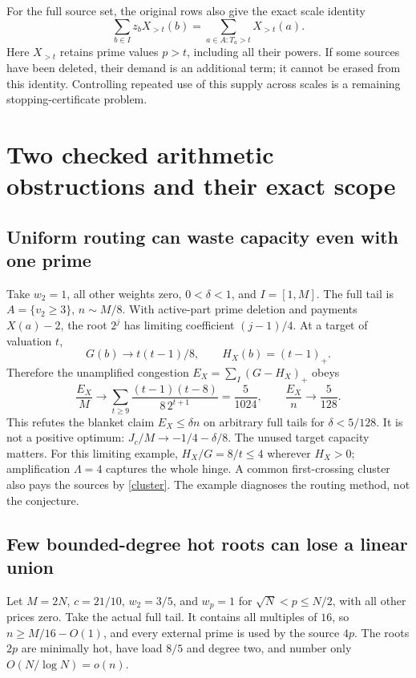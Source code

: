 \documentclass[11pt,a4paper]{article}
\begin{document}
For the full source set, the original rows also give the exact scale identity
\[
 \sum_{b\in I}z_bX_{>t}(b)
 =\sum_{a\in A:T_a>t}X_{>t}(a).
\]
Here $X_{>t}$ retains prime values $p>t$, including all their powers. If some
sources have been deleted, their demand is an additional term; it cannot
be erased from this identity. Controlling repeated use of this supply
across scales is a remaining stopping-certificate problem.

\section{Two checked arithmetic obstructions and their exact scope}

\subsection{Uniform routing can waste capacity even with one prime}

Take $w_2=1$, all other weights zero, $0<\delta<1$, and $I=[1,M]$.
The full tail is $A=\{v_2\ge3\}$, $n\sim M/8$. With active-part prime deletion
and payments $X(a)-2$, the root $2^j$ has limiting coefficient $(j-1)/4$.
At a target of valuation $t$,
\[
 G(b)\longrightarrow t(t-1)/8,\qquad H_X(b)=(t-1)_+.
\]
Therefore the unamplified congestion $E_X=\sum_I(G-H_X)_+$ obeys
\begin{equation}
 \frac{E_X}{M}\longrightarrow
 \sum_{t\ge9}\frac{(t-1)(t-8)}{8\,2^{t+1}}=\frac5{1024},
 \qquad \frac{E_X}{n}\longrightarrow\frac5{128}.           \label{oneprime}
\end{equation}
This refutes the blanket claim $E_X\le\delta n$ on arbitrary full tails
for $\delta<5/128$. It is not a positive optimum:
$J_c/M\to-1/4-\delta/8$. The unused target capacity matters.
For this limiting example, $H_X/G=8/t\le4$ wherever $H_X>0$; amplification
$\Lambda=4$ captures the whole hinge. A common first-crossing cluster also
pays the sources by \eqref{cluster}. The example diagnoses the routing
method, not the conjecture.

\subsection{Few bounded-degree hot roots can lose a linear union}

Let $M=2N$, $c=21/10$, $w_2=3/5$, and $w_p=1$ for
$\sqrt N<p\le N/2$, with all other prices zero. Take the actual full tail.
It contains all multiples of $16$, so $n\ge M/16-O(1)$, and every external
prime is used by the source $4p$. The roots $2p$ are minimally hot, have
load $8/5$ and degree two, and number only $O(N/\log N)=o(n)$.
\end{document}
